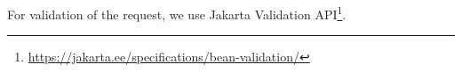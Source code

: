 \documentclass[../main.tex]{subfiles}
\begin{document}
For validation of the request, we use Jakarta Validation API\footnote{\url{https://jakarta.ee/specifications/bean-validation/}}.

\end{document}

